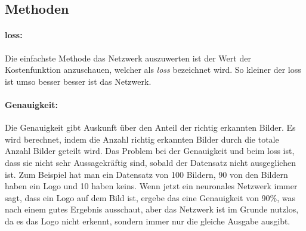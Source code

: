 \documentclass[12pt,a4paper]{report}
\begin{document}
\subsection{Methoden}
\paragraph{loss:} Die einfachste Methode das Netzwerk auszuwerten ist der Wert der Kostenfunktion anzuschauen, welcher als \textit{loss} bezeichnet wird.
So kleiner der loss ist umso besser besser ist das Netzwerk.

\paragraph{Genauigkeit:} Die Genauigkeit gibt Auskunft über den Anteil der richtig erkannten Bilder.
Es wird berechnet, indem die Anzahl richtig erkannten Bilder durch die totale Anzahl Bilder geteilt wird.
Das Problem bei der Genauigkeit und beim loss ist, dass sie nicht sehr Aussagekräftig sind,
sobald der Datensatz nicht ausgeglichen ist.
Zum Beispiel hat man ein Datensatz von 100 Bildern, 90 von den Bildern haben ein Logo und 10 haben keins.
Wenn jetzt ein neuronales Netzwerk immer sagt, dass ein Logo auf dem Bild ist, ergebe das eine Genauigkeit von 90\%,
was nach einem gutes Ergebnis ausschaut, aber das Netzwerk ist im Grunde nutzlos, da es das Logo nicht erkennt,
sondern immer nur die gleiche Ausgabe ausgibt.
\end{document}
